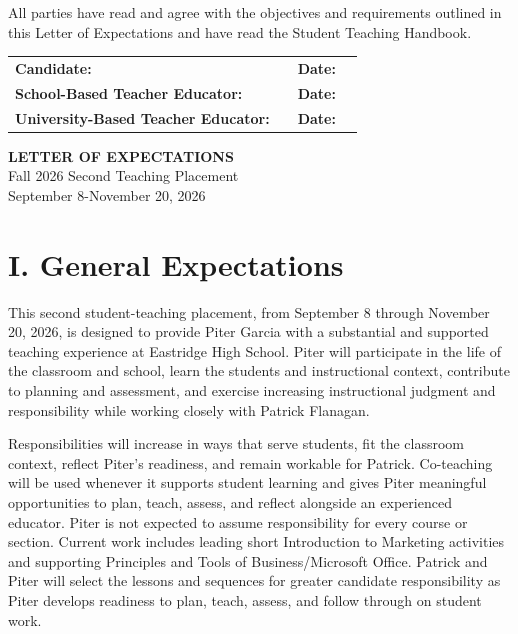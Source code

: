 \documentclass[10pt]{article}
\newcommand{\CandidateName}{Piter Garcia}
\newcommand{\SBTEName}{Patrick Flanagan}
\begin{document}
All parties have read and agree with the objectives and requirements outlined in this Letter of Expectations and have read the Student Teaching Handbook.

\vspace{11pt}
\begin{tabularx}{\textwidth}{@{}>{\RaggedRight\arraybackslash}p{}X p{}p{}@{}}
\textbf{Candidate:} & \hrulefill & \textbf{Date:} & \hrulefill \\[12pt]
\textbf{School-Based Teacher Educator:} & \hrulefill & \textbf{Date:} & \hrulefill \\[12pt]
\textbf{University-Based Teacher Educator:} & \hrulefill & \textbf{Date:} & \hrulefill \\
\end{tabularx}
\normalsize

\newpage

\begin{center}
{\LARGE\bfseries LETTER OF EXPECTATIONS}\\[3pt]
{\large Fall 2026 Second Teaching Placement}\\[2pt]
{\normalsize September 8-November 20, 2026}
\end{center}

\section*{I. General Expectations}

This second student-teaching placement, from September 8 through November 20, 2026, is designed to provide \CandidateName{} with a substantial and supported teaching experience at Eastridge High School. Piter will participate in the life of the classroom and school, learn the students and instructional context, contribute to planning and assessment, and exercise increasing instructional judgment and responsibility while working closely with \SBTEName{}.

Responsibilities will increase in ways that serve students, fit the classroom context, reflect Piter's readiness, and remain workable for Patrick. Co-teaching will be used whenever it supports student learning and gives Piter meaningful opportunities to plan, teach, assess, and reflect alongside an experienced educator. Piter is not expected to assume responsibility for every course or section. Current work includes leading short Introduction to Marketing activities and supporting Principles and Tools of Business/Microsoft Office. Patrick and Piter will select the lessons and sequences for greater candidate responsibility as Piter develops readiness to plan, teach, assess, and follow through on student work.
\end{document}
